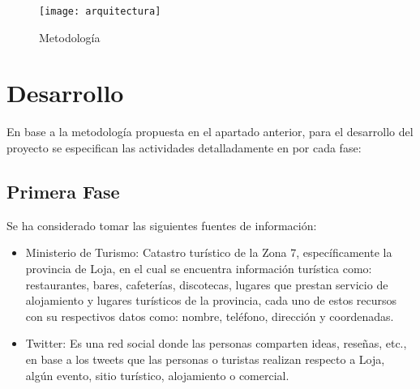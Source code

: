 \documentclass[lnbip,sechang,a4paper]{svmultln}
\begin{document}
\begin{figure}
\centering
\texttt{[image: arquitectura]}
\caption{Metodología}
\label{fig:uno}
\end{figure}


\section{Desarrollo}
En base a la metodología propuesta en el apartado anterior, para el desarrollo
del proyecto se especifican las actividades detalladamente en por cada fase:
\subsection{Primera Fase}

Se ha considerado tomar las siguientes fuentes de información:
\begin{itemize}
    \item Ministerio de Turismo: Catastro turístico de la Zona 7, específicamente la provincia de Loja, en el cual se encuentra información turística como: restaurantes, bares, cafeterías, discotecas, lugares que prestan servicio de alojamiento y lugares turísticos de la provincia, cada uno de estos recursos con su respectivos datos como: nombre, teléfono, dirección y coordenadas.
    \item Twitter: Es una red social donde las personas comparten ideas, reseñas, etc., en base a los tweets que las personas o turistas realizan respecto a Loja, algún evento, sitio turístico, alojamiento o comercial.
    
\end{itemize}
\end{document}
